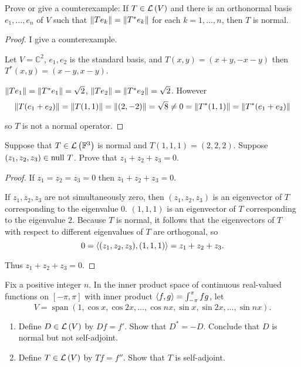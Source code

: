 \begin{exercise}
    Prove or give a counterexample: If $T\in \mathcal{L}\left({V}\right)$ and there is an orthonormal basis $e_{1}, \ldots, e_{n}$ of $V$ such that $\left\Vert{Te_{k}}\right\Vert = \left\Vert{T^{*}e_{k}}\right\Vert$ for each $k = 1,\ldots, n$, then $T$ is normal.
\end{exercise}

\begin{proof}
    I give a counterexample.

    Let $V = \mathbb{C}^{2}$, $e_{1}, e_{2}$ is the standard basis, and $T(x, y) = (x + y, - x - y)$ then $T^{*}(x, y) = (x - y, x - y)$.

    $\left\Vert{Te_{1}}\right\Vert = \left\Vert{T^{*}e_{1}}\right\Vert = \sqrt{2}$, $\left\Vert{Te_{2}}\right\Vert = \left\Vert{T^{*}e_{2}}\right\Vert = \sqrt{2}$. However
    \[
        \left\Vert{T(e_{1} + e_{2})}\right\Vert = \left\Vert{T(1, 1)}\right\Vert = \left\Vert{(2, -2)}\right\Vert = \sqrt{8} \ne 0 = \left\Vert{T^{*}(1, 1)}\right\Vert = \left\Vert{T^{*}(e_{1} + e_{2})}\right\Vert
    \]

    so $T$ is not a normal operator.
\end{proof}
\newpage

\begin{exercise}
    Suppose that $T\in\mathcal{L}\left({\mathbb{F}^{3}}\right)$ is normal and $T(1, 1, 1) = (2, 2, 2)$. Suppose $(z_{1}, z_{2}, z_{3})\in\operatorname{null}\,{T}$. Prove that $z_{1} + z_{2} + z_{3} = 0$.
\end{exercise}

\begin{proof}
    If $z_{1} = z_{2} = z_{3} = 0$ then $z_{1} + z_{2} + z_{3} = 0$.

    If $z_{1}, z_{2}, z_{3}$ are not simultaneously zero, then $(z_{1}, z_{2}, z_{3})$ is an eigenvector of $T$ corresponding to the eigenvalue $0$. $(1, 1, 1)$ is an eigenvector of $T$ corresponding to the eigenvalue $2$. Because $T$ is normal, it follows that the eigenvectors of $T$ with respect to different eigenvalues of $T$ are orthogonal, so
    \[
        0 = \left\langle{(z_{1}, z_{2}, z_{3}), (1, 1, 1)}\right\rangle = z_{1} + z_{2} + z_{3}.
    \]

    Thus $z_{1} + z_{2} + z_{3} = 0$.
\end{proof}
\newpage

\begin{exercise}\label{chapter7:sectionA:exercise31}
    Fix a positive integer $n$. In the inner product space of continuous real-valued functions on $[-\pi, \pi]$ with inner product $\left\langle{f, g}\right\rangle = \int^{\pi}_{-\pi}fg$, let
    \[
        V = \operatorname{span}(1, \cos x, \cos 2x, \ldots, \cos nx, \sin x, \sin 2x, \ldots, \sin nx).
    \]

    \begin{enumerate}[label={(\alph*)}]
        \item Define $D\in\mathcal{L}\left({V}\right)$ by $Df = f'$. Show that $D^{*} = -D$. Conclude that $D$ is normal but not self-adjoint.
        \item Define $T\in\mathcal{L}\left({V}\right)$ by $Tf = f''$. Show that $T$ is self-adjoint.
    \end{enumerate}
\end{exercise}

